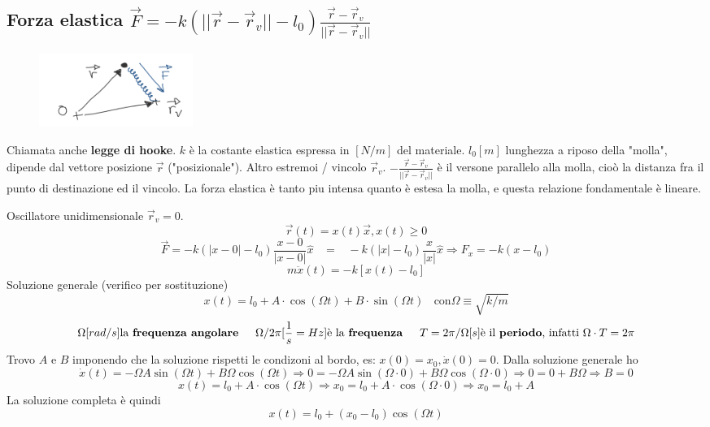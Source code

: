 \subsection{Forza elastica $\vec{F} = -k (||\vec{r} - \vec{r}_v|| - l_0)\frac{\vec{r}-\vec{r}_v}{||\vec{r}-\vec{r}_v||}$}
\begin{figure}
    \vspace{-15pt}
    \centering
    \includegraphics[width=5cm]{images/forza-elastica.png}
\end{figure}
Chiamata anche \textbf{legge di hooke}. $k$ è la costante elastica espressa in $[N/m]$ del materiale. $l_0 [m]$ lunghezza a riposo della "molla", 
dipende dal vettore posizione $\vec{r}$ ("posizionale"). Altro estremoi / vincolo $\vec{r}_v$.
$-\frac{\vec{r}-\vec{r}_v}{||\vec{r}-\vec{r}_v||}$ è il versone parallelo alla molla, cioò la distanza fra il punto di destinazione ed il vincolo.
La forza elastica è tanto piu intensa quanto è estesa la molla, e questa relazione fondamentale è lineare.
\begin{example}
    Oscillatore unidimensionale $\vec{r}_v = 0$.
    $$\vec{r}(t) = x(t)\vec{x}, x(t)\geq 0$$
    $$\vec{F}= -k(|x-0| - l_0)\frac{x - 0}{|x - 0|}\hat{x} \hspace{10pt} = \hspace{10pt} -k(|x| - l_0)\frac{x}{|x|}\hat{x} \Rightarrow F_x = -k(x-l_0)$$
    $$m\ddot{x}(t) = -k[x(t) - l_0]$$
    Soluzione generale (verifico per sostituzione)
    $$x(t) = l_0 + A \cdot \cos(\Omega t) + B \cdot \sin(\Omega t) \:\:\:\: \text{con} \Omega \equiv \sqrt{k/m}$$
    $$\Omega[rad/s] \text{la \textbf{frequenza angolare}} \hspace{15pt} \Omega/2\pi [\frac{1}{s} = Hz] \text{è la \textbf{frequenza}} \hspace{15pt} T = 2\pi/\Omega [s] \text{è il \textbf{periodo}, infatti } \Omega \cdot T = 2\pi$$ 
    Trovo $A$ e $B$ imponendo che la soluzione rispetti le condizoni al bordo, es: $x(0) = x_0, \dot{x}(0) = 0$. 
    Dalla soluzione generale ho 
    $$\dot{x}(t) = -\Omega A \sin(\Omega t) + B \Omega \cos(\Omega t) \Rightarrow 0 = -\Omega A \sin(\Omega \cdot 0) + B \Omega \cos(\Omega \cdot 0) \Rightarrow 0 = 0 + B\Omega \Rightarrow B = 0$$
    $$x(t) = l_0 + A \cdot \cos(\Omega t) \Rightarrow x_0 = l_0 + A \cdot \cos(\Omega \cdot 0) \Rightarrow x_0 = l_0 + A$$
    La soluzione completa è quindi
    $$x(t) = l_0 + (x_0 - l_0) \cos(\Omega t)$$
\end{example}

